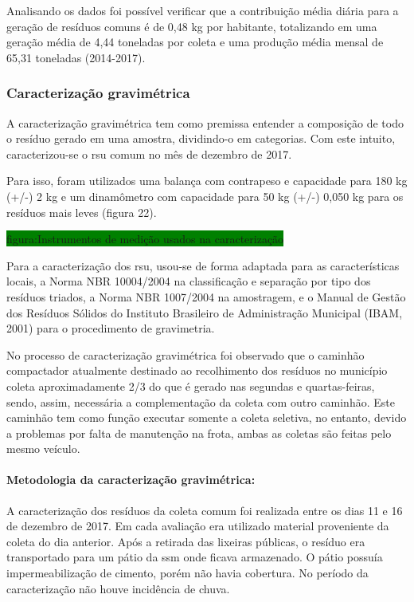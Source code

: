 	Analisando os dados foi possível verificar que a contribuição média diária para a geração de resíduos comuns é de 0,48 kg por habitante, totalizando em uma geração média de 4,44 toneladas por coleta e uma produção média mensal de 65,31 toneladas (2014-2017).
	
	\subsubsection{Caracterização gravimétrica} 	
	A caracterização gravimétrica tem como premissa entender a composição de todo o resíduo gerado em uma amostra, dividindo-o em categorias. Com este intuito, caracterizou-se o \gls{rsu} comum no mês de dezembro de 2017.
	
	Para isso, foram utilizados uma balança com contrapeso e capacidade para 180 kg (+/-) 2 kg e um dinamômetro com capacidade para 50 kg (+/-) 0,050 kg para os resíduos mais leves (figura 22).
	
	\colorbox{green}{figura:Instrumentos de medição usados na caracterização}
	
	Para a caracterização dos \gls{rsu}, usou-se de forma adaptada para as características locais, a Norma NBR 10004/2004 na classificação e separação por tipo dos resíduos triados, a Norma NBR 1007/2004 na amostragem, e o Manual de Gestão dos Resíduos Sólidos do Instituto Brasileiro de Administração Municipal (IBAM, 2001) para o procedimento de gravimetria.
	
	No processo de caracterização gravimétrica foi observado que o caminhão compactador atualmente destinado ao recolhimento dos resíduos no município coleta aproximadamente 2/3 do que é gerado nas segundas e quartas-feiras, sendo, assim, necessária a complementação da coleta com outro caminhão. Este caminhão tem como função executar somente a coleta seletiva, no entanto, devido a problemas por falta de manutenção na frota, ambas as coletas são feitas pelo mesmo veículo.
	
	\paragraph{\textbf{Metodologia da caracterização gravimétrica:}}
	
	A caracterização dos resíduos da coleta comum foi realizada entre os dias 11 e 16 de dezembro de 2017. Em cada avaliação era utilizado material proveniente da coleta do dia anterior. Após a retirada das lixeiras públicas, o resíduo era transportado para um pátio da \gls{ssm} onde ficava armazenado. O pátio possuía impermeabilização de cimento, porém não havia cobertura. No período da caracterização não houve incidência de chuva.
	

